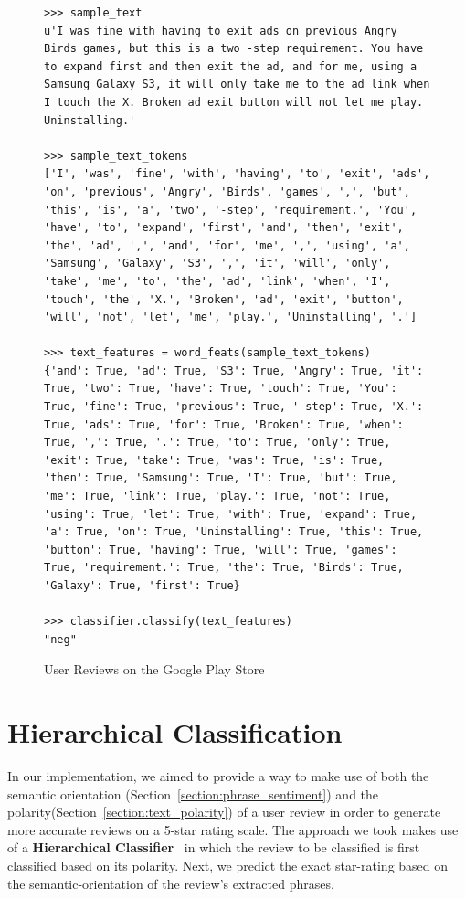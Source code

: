 \documentclass[11pt]{report} %
\begin{document}
\begin{figure}[h!]
  \centering
\begin{lstlisting}
>>> sample_text
u'I was fine with having to exit ads on previous Angry Birds games, but this is a two -step requirement. You have to expand first and then exit the ad, and for me, using a Samsung Galaxy S3, it will only take me to the ad link when I touch the X. Broken ad exit button will not let me play. Uninstalling.'

>>> sample_text_tokens
['I', 'was', 'fine', 'with', 'having', 'to', 'exit', 'ads', 'on', 'previous', 'Angry', 'Birds', 'games', ',', 'but', 'this', 'is', 'a', 'two', '-step', 'requirement.', 'You', 'have', 'to', 'expand', 'first', 'and', 'then', 'exit', 'the', 'ad', ',', 'and', 'for', 'me', ',', 'using', 'a', 'Samsung', 'Galaxy', 'S3', ',', 'it', 'will', 'only', 'take', 'me', 'to', 'the', 'ad', 'link', 'when', 'I', 'touch', 'the', 'X.', 'Broken', 'ad', 'exit', 'button', 'will', 'not', 'let', 'me', 'play.', 'Uninstalling', '.']

>>> text_features = word_feats(sample_text_tokens)
{'and': True, 'ad': True, 'S3': True, 'Angry': True, 'it': True, 'two': True, 'have': True, 'touch': True, 'You': True, 'fine': True, 'previous': True, '-step': True, 'X.': True, 'ads': True, 'for': True, 'Broken': True, 'when': True, ',': True, '.': True, 'to': True, 'only': True, 'exit': True, 'take': True, 'was': True, 'is': True, 'then': True, 'Samsung': True, 'I': True, 'but': True, 'me': True, 'link': True, 'play.': True, 'not': True, 'using': True, 'let': True, 'with': True, 'expand': True, 'a': True, 'on': True, 'Uninstalling': True, 'this': True, 'button': True, 'having': True, 'will': True, 'games': True, 'requirement.': True, 'the': True, 'Birds': True, 'Galaxy': True, 'first': True}

>>> classifier.classify(text_features)
"neg"

\end{lstlisting}
 \caption{User Reviews on the Google Play Store}
\label{fig:naivebayes_classifying_review}
\end{figure}

\section{Hierarchical Classification}
In our implementation, we aimed to provide a way to make use of both the semantic orientation (Section~\ref{section:phrase_sentiment}) and the polarity(Section~\ref{section:text_polarity}) of a user review in order to generate more accurate reviews on a 5-star rating scale. The approach we took makes use of a \textbf{Hierarchical Classifier}~\cite{ruiz2002hierarchical,sun2001hierarchical} in which the review to be classified is first classified based on its polarity. Next, we predict the exact star-rating based on the semantic-orientation of the review's extracted phrases.
\end{document}
